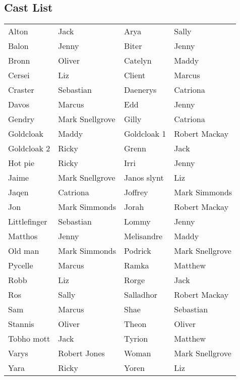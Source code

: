 \subsection*{Cast List}
\begin{tabular}{ll|ll}\\
Alton & Jack &  Arya & Sally\\
Balon & Jenny &  Biter & Jenny\\
Bronn & Oliver &  Catelyn & Maddy\\
Cersei & Liz &  Client & Marcus\\
Craster & Sebastian &  Daenerys & Catriona\\
Davos & Marcus &  Edd & Jenny\\
Gendry & Mark Snellgrove &  Gilly & Catriona\\
Goldcloak & Maddy &  Goldcloak 1 & Robert Mackay\\
Goldcloak 2 & Ricky &  Grenn & Jack\\
Hot pie & Ricky &  Irri & Jenny\\
Jaime & Mark Snellgrove &  Janos slynt & Liz\\
Jaqen & Catriona &  Joffrey & Mark Simmonds\\
Jon & Mark Simmonds &  Jorah & Robert Mackay\\
Littlefinger & Sebastian &  Lommy & Jenny\\
Matthos & Jenny &  Melisandre & Maddy\\
Old man & Mark Simmonds &  Podrick & Mark Snellgrove\\
Pycelle & Marcus &  Ramka & Matthew\\
Robb & Liz &  Rorge & Jack\\
Ros & Sally &  Salladhor & Robert Mackay\\
Sam & Marcus &  Shae & Sebastian\\
Stannis & Oliver &  Theon & Oliver\\
Tobho mott & Jack &  Tyrion & Matthew\\
Varys & Robert Jones &  Woman & Mark Snellgrove\\
Yara & Ricky &  Yoren & Liz\\
\end{tabular}
